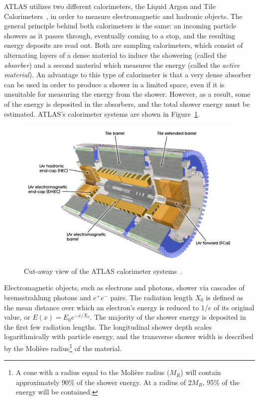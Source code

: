 ﻿ATLAS utilizes two different calorimeters, the Liquid Argon and Tile Calorimeters~\cite{1996.lar-tdr, 1996.tilecal-tdr}, in order to measure electromagnetic and hadronic objects.
The general principle behind both calorimeters is the same: an incoming particle showers as it passes through, eventually coming to a stop, and the resulting energy deposits are read out.
Both are sampling calorimeters, which consist of alternating layers of a dense material to induce the showering (called the \emph{absorber}) and a second material which measures the energy (called the \emph{active material}).
An advantage to this type of calorimeter is that a very dense absorber can be used in order to produce a shower in a limited space, even if it is unsuitable for measuring the energy from the shower.
However, as a result, some of the energy is deposited in the absorbers, and the total shower energy must be estimated.
ATLAS's calorimeter systems are shown in Figure~\ref{fig:calorimeters}.

\begin{figure}[htbp]
  \centering
  \includegraphics[width=.8\textwidth]{figs/detector/calorimeter}
  \caption[Cut-away view of the ATLAS calorimeter systems.]{Cut-away view of the ATLAS calorimeter systems~\cite{2018.tilecal}.}
  \label{fig:calorimeters}
\end{figure}

Electromagnetic objects, such as electrons and photons, shower via cascades of bremsstrahlung photons and $e^+ e^-$ pairs.
The radiation length $X_0$ is defined as the mean distance over which an electron's energy is reduced to $1/e$ of its original value, or $E(x) = E_{0}e^{-x/X_0}$.
The majority of the shower energy is deposited in the first few radiation lengths.
The longitudinal shower depth scales logarithmically with particle energy, and the transverse shower width is described by the Moli\`{e}re radius\footnote{A cone with a radius equal to the Moli\`{e}re radius ($M_R$) will contain approximately 90\% of the shower energy.  At a radius of $2M_R$, 95\% of the energy will be contained.} of the material.

